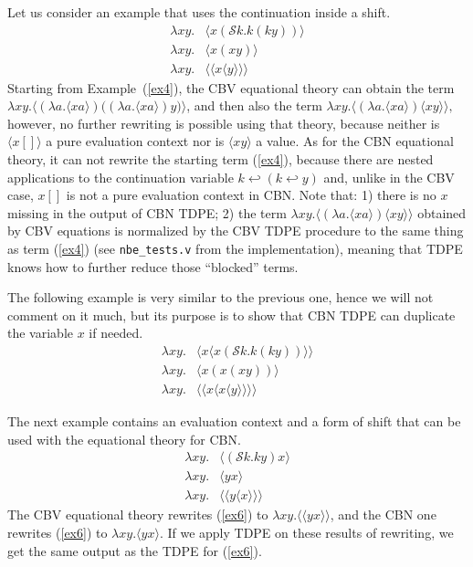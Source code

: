 \documentclass{eptcs}
\newcommand{\ureset}[1]{\langle{#1}\rangle}
\newcommand{\ushift}[2]{\mathcal{S}{#1}.{#2}}
\theoremstyle{definition}
\theoremstyle{plain}
\theoremstyle{remark}
\begin{document}
Let us consider an example that uses the continuation inside a shift.
\begin{align}
\lambda x y.& \ureset{x (\ushift{k}{k(k y)})}\label{ex4}\\
\lambda x y.& {\ureset{x (x y)}} \tag{CBV}\\
\lambda x y.& \ureset{\ureset{x \ureset{y}}} \tag{CBN}
\end{align}
Starting from Example~(\ref{ex4}), the CBV equational theory can obtain the term
$
\lambda x y. \ureset{(\lambda a.\ureset{x a})\big((\lambda a.\ureset{x a}) y\big)}$,
and then also the term
$
\lambda x y. \ureset{(\lambda a.\ureset{x a})\ureset{x y}},
$
however, no further rewriting is possible using that theory, because neither is $\ureset{x []}$ a pure evaluation context nor is $\ureset{x y}$ a value. As for the CBN equational theory, it can not rewrite the starting term (\ref{ex4}), because there are nested applications to the continuation variable $k\hookleftarrow (k \hookleftarrow y)$ and, unlike in the CBV case, $x []$ is not a pure evaluation context in CBN. Note that: 1) there is no $x$ missing in the output of CBN TDPE; 2) the term
$
\lambda x y. \ureset{(\lambda a.\ureset{x a})\ureset{x y}}
$
obtained by CBV equations is normalized by the CBV TDPE procedure to the same thing as term (\ref{ex4}) (see \texttt{nbe\_tests.v} from the implementation), meaning that TDPE knows how to further reduce those ``blocked'' terms.

The following example is very similar to the previous one, hence we will not comment on it much, but its purpose is to show that CBN TDPE can duplicate the variable $x$ if needed.
\begin{align}
\lambda x y.& \ureset{x\ureset{x (\ushift{k}{k(k y)})}}\label{ex5}\\
\lambda x y.& {\ureset{x (x (x y))}} \tag{CBV}\\
\lambda x y.& \ureset{\ureset{x\ureset{x \ureset{y}}}} \tag{CBN}
\end{align}

The next example contains an evaluation context and a form of shift that can be used with the equational theory for CBN.
\begin{align}
\lambda x y.& \ureset{(\ushift{k}{k y}) x}\label{ex6}\\
\lambda x y.& \ureset{y x} \tag{CBV}\\
\lambda x y.& \ureset{\ureset{y\ureset{x}}} \tag{CBN}
\end{align}
The CBV equational theory rewrites (\ref{ex6}) to $\lambda xy.\ureset{\ureset{y x}}$, and the CBN one rewrites (\ref{ex6}) to $\lambda xy.\ureset{y x}$. If we apply TDPE on these results of rewriting, we get the same output as the TDPE for (\ref{ex6}).
\end{document}

